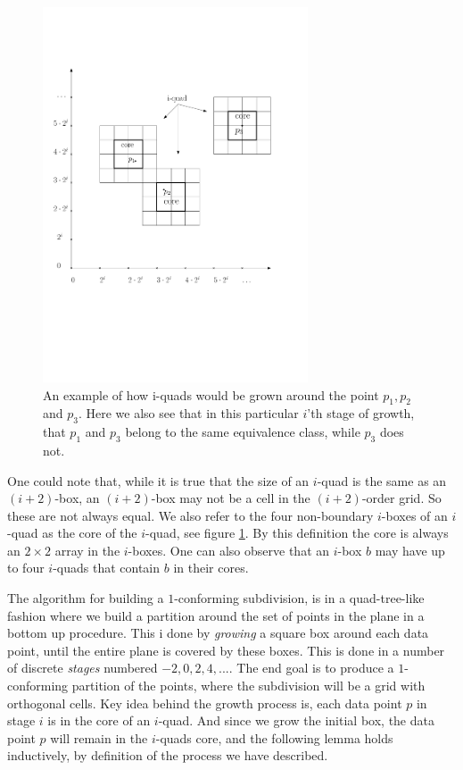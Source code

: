 \begin{figure}[H]
	\centering
	\includegraphics[width=0.7\textwidth]{figures/iquad.pdf}
	\caption{An example of how i-quads would be grown around the point $p_1, 
    		 p_2$ and $p_3$. Here we also see that in this particular $i$'th stage of growth, 
             that $p_1$ and $p_3$ belong to the same equivalence class, while $p_3$ does 
             not.}
	\label{fig:iquad}
\end{figure}

One could note that, while it is true that the size of an $i$-quad is the same as an 
$(i+2)$-box, an $(i+2)$-box may not be a cell in the $(i+2)$-order grid. So these are not 
always equal. We also refer to the four non-boundary $i$-boxes of an $i$-quad as the core of 
the $i$-quad, see figure \ref{fig:iquad}. By this definition the core is always an $2 \times 
2$ array in the $i$-boxes. One can also observe that an $i$-box $b$ may have up to four 
$i$-quads that contain $b$ in their cores.

The algorithm for building a $1$-conforming subdivision, is in a quad-tree-like fashion where 
we build a partition around the set of points in the plane in a bottom up procedure. This i done 
by \textit{growing} a square box around each data point, until the entire plane is covered by 
these boxes. This is done in a number of discrete \textit{stages} numbered $-2, 0, 2, 4,...$. 
The end goal is to produce a $1$-conforming partition of the points, where the subdivision will 
be a grid with orthogonal cells. Key idea behind the growth process is, each data point $p$ in
stage $i$ is in the core of an $i$-quad. And since we grow the initial box, the data point $p$
will remain in the $i$-quads core, and the following lemma holds inductively, by definition of
the process we have described.

